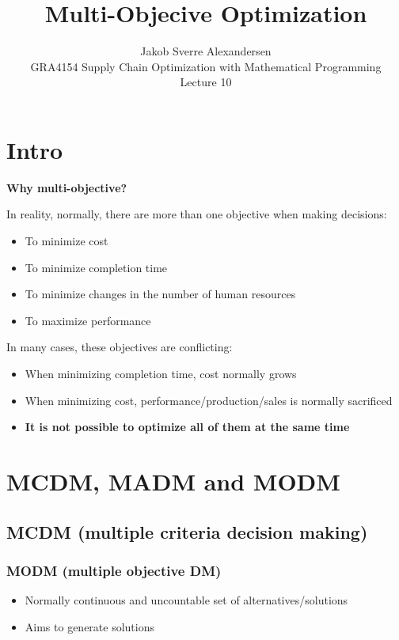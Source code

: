 \documentclass[10pt]{article}
\begin{document}
 
\title{Multi-Objecive Optimization}
\author{Jakob Sverre Alexandersen\\
GRA4154 Supply Chain Optimization with Mathematical Programming\\
Lecture 10}
\maketitle

\tableofcontents
\newpage
\section{Intro}

\textbf{Why multi-objective?}

In reality, normally, there are more than one objective when making decisions: 
\begin{itemize}
    \item To minimize cost 
    \item To minimize completion time
    \item To minimize changes in the number of human resources 
    \item To maximize performance 
\end{itemize}
In many cases, these objectives are conflicting: 
\begin{itemize}
    \item When minimizing completion time, cost normally grows 
    \item When minimizing cost, performance/production/sales is normally sacrificed 
    \item \textbf{It is not possible to optimize all of them at the same time}
\end{itemize}
\section{MCDM, MADM and MODM}
\subsection{MCDM (multiple criteria decision making)}
\subsubsection{MODM (multiple objective DM)}
\begin{itemize}
    \item Normally continuous and uncountable set of alternatives/solutions 
    \item Aims to generate solutions 
\end{itemize}
\end{document}
